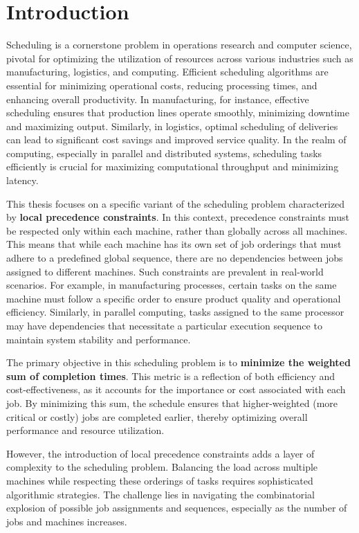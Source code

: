 \chapter{Introduction}

Scheduling is a cornerstone problem in operations research and computer science, pivotal for optimizing the utilization of resources across various industries such as manufacturing, logistics, and computing. Efficient scheduling algorithms are essential for minimizing operational costs, reducing processing times, and enhancing overall productivity. In manufacturing, for instance, effective scheduling ensures that production lines operate smoothly, minimizing downtime and maximizing output. Similarly, in logistics, optimal scheduling of deliveries can lead to significant cost savings and improved service quality. In the realm of computing, especially in parallel and distributed systems, scheduling tasks efficiently is crucial for maximizing computational throughput and minimizing latency.

This thesis focuses on a specific variant of the scheduling problem characterized by \textbf{local precedence constraints}. In this context, precedence constraints must be respected only within each machine, rather than globally across all machines. This means that while each machine has its own set of job orderings that must adhere to a predefined global sequence, there are no dependencies between jobs assigned to different machines. Such constraints are prevalent in real-world scenarios. For example, in manufacturing processes, certain tasks on the same machine must follow a specific order to ensure product quality and operational efficiency. Similarly, in parallel computing, tasks assigned to the same processor may have dependencies that necessitate a particular execution sequence to maintain system stability and performance.

The primary objective in this scheduling problem is to \textbf{minimize the weighted sum of completion times}. This metric is a reflection of both efficiency and cost-effectiveness, as it accounts for the importance or cost associated with each job. By minimizing this sum, the schedule ensures that higher-weighted (more critical or costly) jobs are completed earlier, thereby optimizing overall performance and resource utilization. \hfill \break

However, the introduction of local precedence constraints adds a layer of complexity to the scheduling problem. Balancing the load across multiple machines while respecting these orderings of tasks requires sophisticated algorithmic strategies. The challenge lies in navigating the combinatorial explosion of possible job assignments and sequences, especially as the number of jobs and machines increases.

